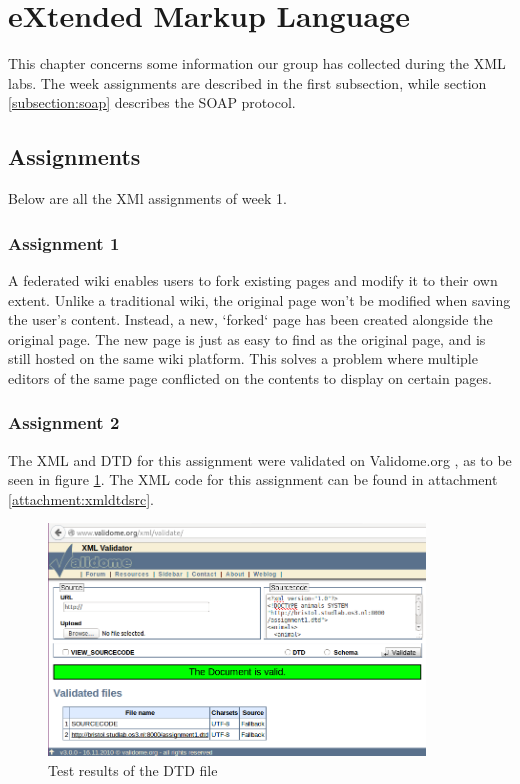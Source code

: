 \section{eXtended Markup Language}
This chapter concerns some information our group has collected during the XML labs. The week assignments are described in the first subsection, while section \ref{subsection:soap} describes the SOAP protocol.

\subsection{Assignments}
Below are all the XMl assignments of week 1.

\subsubsection{Assignment 1}
 A federated wiki enables users to fork existing pages and modify it to their own extent. Unlike a traditional wiki, the original page won't be modified when saving the user's content. Instead, a new, `forked` page has been created alongside the original page. The new page is just as easy to find as the original page, and is still hosted on the same wiki platform. This solves a problem where multiple editors of the same page conflicted on the contents to display on certain pages.

\subsubsection{Assignment 2}
The XML and DTD for this assignment were validated on Validome.org , as to be seen in figure \ref{fig:xmldtdtest}. The XML code for this assignment can be found in attachment \ref{attachment:xmldtdsrc}.
\begin{figure}[h]
	\centering
	\includegraphics[width=100mm]{img/xmldtdtest.png}
	\caption{Test results of the DTD file}\label{fig:xmldtdtest}
\end{figure}

